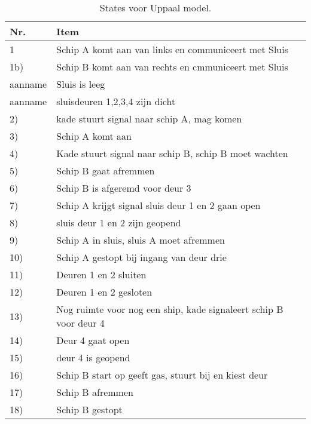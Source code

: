 \documentclass[a4paper,12pt]{article}
\begin{document}
\begin{table}[hbt!] %
\caption{States voor Uppaal model.} %
\label{reqs} %
\begin{center} %
\begin{tabular}{llc} %
\hline %
\textbf{Nr.} & \textbf{Item} & \\ %
\hline
1 & Schip A komt aan van links en communiceert met Sluis & \\
1b) & Schip B komt aan van rechts en cmmuniceert met Sluis & \\
aanname & Sluis is leeg & \\
aanname & sluisdeuren 1,2,3,4 zijn dicht & \\
2) & kade stuurt signal naar schip A, mag komen & \\
3) & Schip A komt aan & \\
4) & Kade stuurt signal naar schip B, schip B moet wachten & \\
5) & Schip B gaat afremmen & \\
6) & Schip B is afgeremd voor deur 3 & \\
7) & Schip A krijgt signal sluis deur 1 en 2 gaan open & \\
8) & sluis deur 1 en 2 zijn geopend & \\
9) & Schip A in sluis, sluis A moet afremmen & \\
10) & Schip A gestopt bij ingang van deur drie & \\
11) & Deuren 1 en 2 sluiten & \\
12) & Deuren 1 en 2 gesloten & \\
13) & Nog ruimte voor nog een ship, kade signaleert schip B voor deur 4 & \\
14) & Deur 4 gaat open & \\
15) & deur 4 is geopend & \\
16) & Schip B start op geeft gas, stuurt bij en kiest deur & \\
17) & Schip B afremmen & \\
18) & Schip B gestopt & \\


\end{tabular}
\end{center}
\end{table}
\end{document}
